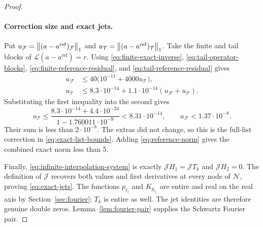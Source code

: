 \begin{proof}
\paragraph{Correction size and exact jets.}
Put \(u_{\mathcal F}=\left\lVert(a-a^{\mathrm{ref}})_{\mathcal F}\right\rVert_1\) and
\(u_{\mathcal T}=\left\lVert(a-a^{\mathrm{ref}})_{\mathcal T}\right\rVert_1\).  Take the finite
and tail blocks of \(\mathcal L(a-a^{\mathrm{ref}})=r\).  Using
\eqref{eq:finite-exact-inverse}, \eqref{eq:tail-operator-blocks},
\eqref{eq:finite-reference-residual}, and \eqref{eq:tail-reference-residual}
gives
\begin{equation}
 \begin{aligned}
 u_{\mathcal F}&\le40\bigl(10^{-11}+4000u_{\mathcal T}\bigr),\\
 u_{\mathcal T}&\le8.3\cdot10^{-14}
       +1.1\cdot10^{-14}(u_{\mathcal F}+u_{\mathcal T}).
 \end{aligned}
 \label{eq:correction-system}
\end{equation}
Substituting the first inequality into the second gives
\[
 u_{\mathcal T}
 \le\frac{8.3\cdot10^{-14}+4.4\cdot10^{-24}}
          {1-1.760011\cdot10^{-9}}
 <8.31\cdot10^{-14},\qquad
 u_{\mathcal F}<1.37\cdot10^{-8}.
\]
Their sum is less than \(2\cdot10^{-8}\).  The extras did not change, so this
is the full-list correction in \eqref{eq:exact-list-bounds}.  Adding
\eqref{eq:reference-norm} gives the combined exact norm less than 5.

Finally, \eqref{eq:infinite-interpolation-system} is exactly
\(\mathcal JH_1=\mathcal JT_k\) and \(\mathcal JH_2=0\).  The definition of
\(\mathcal J\) recovers both values and first derivatives at every node of
\(\mathcal N\), proving \eqref{eq:exact-jets}.  The functions \(p_{\ell_i}\)
and \(K_{p_{\ell_i}}\) are entire and real on the real axis by
Section~\ref{sec:fourier}; \(T_k\) is entire as well.  The jet identities are
therefore genuine double zeros.  Lemma~\ref{lem:fourier-pair} supplies the
Schwartz Fourier pair.
\end{proof}
